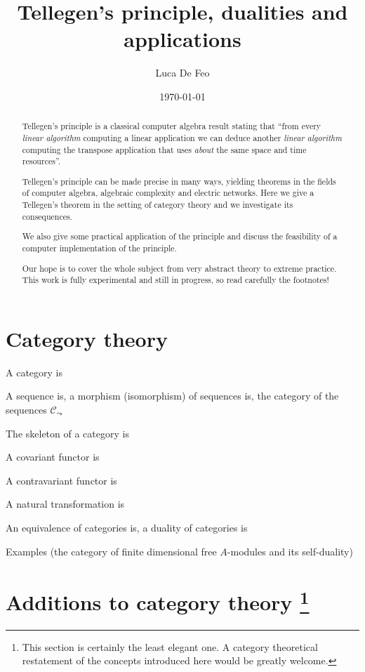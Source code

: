 \documentclass{article}
\newcommand{\cat}[1]{\mathscr{#1}}
\newcommand{\C}{\cat{C}}
\begin{document}
  \title{Tellegen's principle, dualities and applications}
  \author{Luca De Feo}
  \date{\today}
  
  \maketitle

  \begin{abstract}
    Tellegen's principle is a classical computer algebra result
    stating that ``from every \emph{linear algorithm} computing a
    linear application we can deduce another \emph{linear algorithm}
    computing the transpose application that uses \emph{about} the
    same space and time resources''.

    Tellegen's principle can be made precise in many ways, yielding
    theorems in the fields of computer algebra, algebraic complexity
    and electric networks. Here we give a Tellegen's theorem in the
    setting of category theory and we investigate its consequences.

    We also give some practical application of the principle and
    discuss the feasibility of a computer implementation of the
    principle.

    Our hope is to cover the whole subject from very abstract theory
    to extreme practice. This work is fully experimental and still in
    progress, so read carefully the footnotes!
  \end{abstract}


  \section{Category theory}

  A category is

  A sequence is, a morphism (isomorphism) of sequences is, the
  category of the sequences $\C_\leadsto$
  
  The skeleton of a category is

  A covariant functor is
  
  A contravariant functor is

  A natural transformation is

  An equivalence of categories is, a duality of categories is

  Examples (the category of finite dimensional free $A$-modules and
  its self-duality)

  
  \section{Additions to category theory
    \protect\footnote{This section is certainly the least elegant
      one. A category theoretical restatement of the concepts
      introduced here would be greatly welcome.}}
\end{document}
